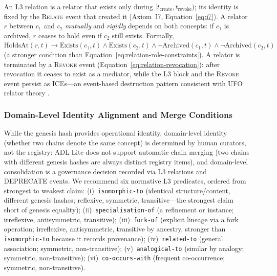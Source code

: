 An L3 relation is a relator that exists only during $[t_{\text{create}}, t_{\text{revoke}})$; its identity is fixed by the \textsc{Relate} event that created it (Axiom~I7, Equation~\ref{eq:i7}). A relator $r$ between $c_1$ and $c_2$ \emph{mutually} and \emph{rigidly} depends on both concepts: if $c_1$ is archived, $r$ ceases to hold even if $c_2$ still exists. Formally, $\text{HoldsAt}(r, t) \rightarrow \text{Exists}(c_1, t) \land \text{Exists}(c_2, t) \land \neg\text{Archived}(c_1, t) \land \neg\text{Archived}(c_2, t)$ (a stronger condition than Equation~\ref{eq:relation-role-constraints}). A relator is terminated by a \textsc{Revoke} event (Equation~\ref{eq:relation-revocation}): after revocation it ceases to exist as a mediator, while the L3 block and the \textsc{Revoke} event persist as ICEs---an event-based destruction pattern consistent with UFO relator theory \cite{ufo}.

\subsubsection{Domain-Level Identity Alignment and Merge Conditions}\label{subsubsec:domain-identity-alignment}

While the genesis hash provides operational identity, domain-level identity (whether two chains denote the same concept) is determined by human curators, not the registry: ADL Lite does not support automatic chain merging (two chains with different genesis hashes are always distinct registry items), and domain-level consolidation is a governance decision recorded via L3 relations and \textsc{DEPRECATE} events. We recommend six normative L3 predicates, ordered from strongest to weakest claim: (i)~\texttt{isomorphic-to} (identical structure/content, different genesis hashes; reflexive, symmetric, transitive---the strongest claim short of genesis equality); (ii)~\texttt{specialisation-of} (a refinement or instance; irreflexive, antisymmetric, transitive); (iii)~\texttt{fork-of} (explicit lineage via a fork operation; irreflexive, antisymmetric, transitive by ancestry, stronger than \texttt{isomorphic-to} because it records provenance); (iv)~\texttt{related-to} (general association; symmetric, non-transitive); (v)~\texttt{analogical-to} (similar by analogy; symmetric, non-transitive); (vi)~\texttt{co-occurs-with} (frequent co-occurrence; symmetric, non-transitive).


